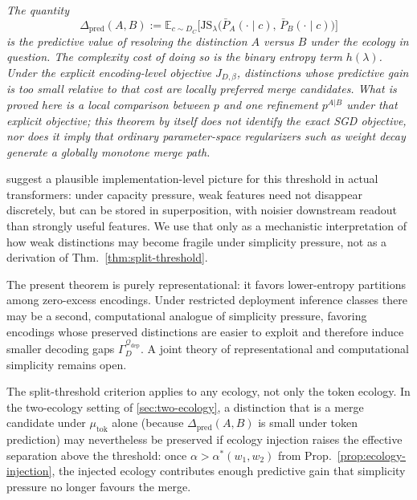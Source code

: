 \documentclass[twoside,11pt]{article}
\newenvironment{interpretation}{\par\noindent{\bf Interpretation.}\itshape}{\par}
\newcommand{\E}{\mathbb{E}}
\newcommand{\JS}{\mathrm{JS}}
\newcommand{\thmref}[1]{Thm.~\ref{#1}}
\newcommand{\propref}[1]{Prop.~\ref{#1}}
\begin{document}
\begin{interpretation}
The quantity
\[
\Delta_{\mathrm{pred}}(A,B)
:= \E_{c \sim D_C}\bigl[
     \JS_{\lambda}\bigl(\bar P_A(\cdot \mid c),\, \bar P_B(\cdot \mid c)\bigr)
   \bigr]
\]
is the predictive value of resolving the distinction $A$ versus $B$ under the ecology in question. The complexity cost of doing so is the binary entropy term $h(\lambda)$. Under the explicit encoding-level objective $J_{D,\beta}$, distinctions whose predictive gain is too small relative to that cost are locally preferred merge candidates. What is proved here is a local comparison between $p$ and one refinement $p^{A|B}$ under that explicit objective; this theorem by itself does not identify the exact SGD objective, nor does it imply that ordinary parameter-space regularizers such as weight decay generate a globally monotone merge path.

\citet{elhage_etal_2022_superposition} suggest a plausible implementation-level picture for this threshold in actual transformers: under capacity pressure, weak features need not disappear discretely, but can be stored in superposition, with noisier downstream readout than strongly useful features. We use that only as a mechanistic interpretation of how weak distinctions may become fragile under simplicity pressure, not as a derivation of \thmref{thm:split-threshold}.

The present theorem is purely representational: it favors lower-entropy partitions among zero-excess encodings. Under restricted deployment inference classes there may be a second, computational analogue of simplicity pressure, favoring encodings whose preserved distinctions are easier to exploit and therefore induce smaller decoding gaps $\Gamma_D^{\mathcal{Q}_{\mathrm{dep}}}$. A joint theory of representational and computational simplicity remains open.

The split-threshold criterion applies to any ecology, not only the token ecology. In the two-ecology setting of \cref{sec:two-ecology}, a distinction that is a merge candidate under $\mu_{\mathrm{tok}}$ alone (because $\Delta_{\mathrm{pred}}(A,B)$ is small under token prediction) may nevertheless be preserved if ecology injection raises the effective separation above the threshold: once $\alpha > \alpha^*(w_1,w_2)$ from \propref{prop:ecology-injection}, the injected ecology contributes enough predictive gain that simplicity pressure no longer favours the merge.
\end{interpretation}
\end{document}
